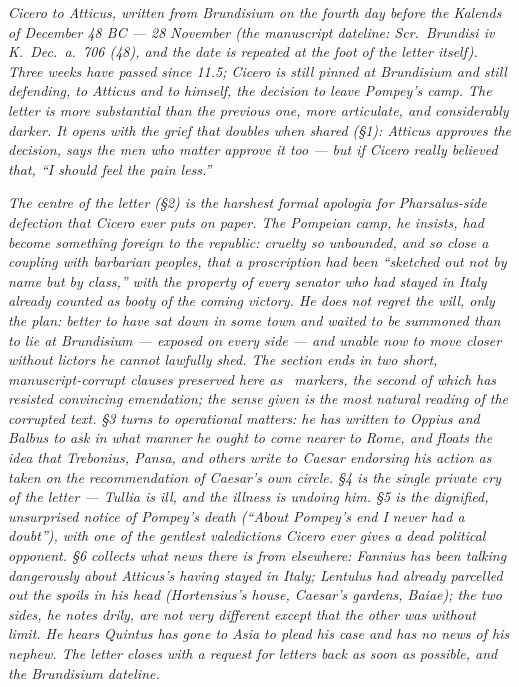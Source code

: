 
\textit{Cicero to Atticus, written from Brundisium on the
fourth day before the Kalends of December 48 BC --- 28
November (the manuscript dateline: \textit{Scr.\ Brundisi iv
K.\ Dec.\ a.\ 706 (48)}, and the date is repeated at the
foot of the letter itself). Three weeks have passed since
11.5; Cicero is still pinned at Brundisium and still
defending, to Atticus and to himself, the decision to leave
Pompey's camp. The letter is more substantial than the
previous one, more articulate, and considerably darker. It
opens with the grief that doubles when shared (\S1): Atticus
approves the decision, says the men who matter approve it
too --- but if Cicero really believed that, ``I should feel
the pain less.''}

\textit{The centre of the letter (\S2) is the harshest
formal apologia for Pharsalus-side defection that Cicero
ever puts on paper. The Pompeian camp, he insists, had become
something foreign to the republic: cruelty so unbounded, and
so close a coupling with barbarian peoples, that a proscription
had been ``sketched out not by name but by class,'' with the
property of every senator who had stayed in Italy already
counted as booty of the coming victory. He does not regret
the will, only the plan: better to have sat down in some
town and waited to be summoned than to lie at Brundisium ---
exposed on every side --- and unable now to move closer
without lictors he cannot lawfully shed. The section ends in
two short, manuscript-corrupt clauses preserved here as
\dag\ markers, the second of which has resisted convincing
emendation; the sense given is the most natural reading of
the corrupted text. \S3 turns to operational matters: he has
written to Oppius and Balbus to ask in what manner he ought
to come nearer to Rome, and floats the idea that Trebonius,
Pansa, and others write to Caesar endorsing his action as
taken on the recommendation of Caesar's own circle. \S4 is
the single private cry of the letter --- Tullia is ill, and
the illness is undoing him. \S5 is the dignified, unsurprised
notice of Pompey's death (``About Pompey's end I never had a
doubt''), with one of the gentlest valedictions Cicero ever
gives a dead political opponent. \S6 collects what news there
is from elsewhere: Fannius has been talking dangerously about
Atticus's having stayed in Italy; Lentulus had already
parcelled out the spoils in his head (Hortensius's house,
Caesar's gardens, Baiae); the two sides, he notes drily,
are not very different except that the other was without
limit. He hears Quintus has gone to Asia to plead his case
and has no news of his nephew. The letter closes with a
request for letters back as soon as possible, and the
Brundisium dateline.}
